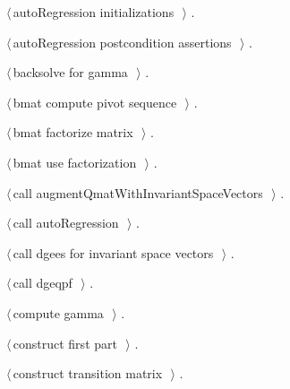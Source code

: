 \documentclass{article}
\begin{document}
{\begin{list}{}{\setlength{\itemsep}{-\parsep}\setlength{\itemindent}{-\leftmargin}}
\item $\langle\,$autoRegression initializations\nobreak\ {\footnotesize {}}$\,\rangle$ {\footnotesize {\NWtxtRefIn} .}
\item $\langle\,$autoRegression postcondition assertions\nobreak\ {\footnotesize {}}$\,\rangle$ {\footnotesize {\NWtxtRefIn} .}
\item $\langle\,$backsolve for gamma\nobreak\ {\footnotesize {}}$\,\rangle$ {\footnotesize {\NWtxtRefIn} .}
\item $\langle\,$bmat compute pivot sequence\nobreak\ {\footnotesize {}}$\,\rangle$ {\footnotesize {\NWtxtRefIn} .}
\item $\langle\,$bmat factorize matrix\nobreak\ {\footnotesize {}}$\,\rangle$ {\footnotesize {\NWtxtRefIn} .}
\item $\langle\,$bmat use factorization\nobreak\ {\footnotesize {}}$\,\rangle$ {\footnotesize {\NWtxtRefIn} .}
\item $\langle\,$call augmentQmatWithInvariantSpaceVectors\nobreak\ {\footnotesize {}}$\,\rangle$ {\footnotesize {\NWtxtRefIn} .}
\item $\langle\,$call autoRegression\nobreak\ {\footnotesize {}}$\,\rangle$ {\footnotesize {\NWtxtRefIn} .}
\item $\langle\,$call dgees for invariant space vectors\nobreak\ {\footnotesize {}}$\,\rangle$ {\footnotesize {\NWtxtRefIn} .}
\item $\langle\,$call dgeqpf\nobreak\ {\footnotesize {}}$\,\rangle$ {\footnotesize {\NWtxtRefIn} .}
\item $\langle\,$compute gamma\nobreak\ {\footnotesize {}}$\,\rangle$ {\footnotesize {\NWtxtRefIn} .}
\item $\langle\,$construct first part\nobreak\ {\footnotesize {}}$\,\rangle$ {\footnotesize {\NWtxtRefIn} .}
\item $\langle\,$construct transition matrix\nobreak\ {\footnotesize {}}$\,\rangle$ {\footnotesize {\NWtxtRefIn} .}

\end{list}}
\end{document}
